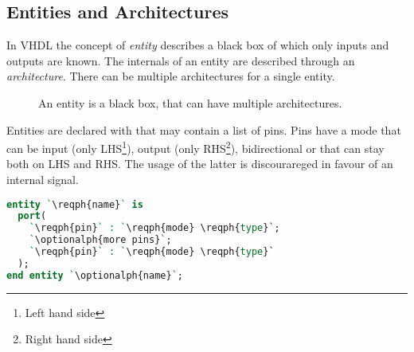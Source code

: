 \subsection{Entities and Architectures}
In VHDL the concept of \emph{entity} describes a black box of which only
inputs and outputs are known. The internals of an entity are described through
an \emph{architecture}. There can be multiple architectures for a single entity.

\begin{figure}[h]
  \centering
  \caption{An entity is a black box, that can have multiple architectures.}
\end{figure}

Entities are declared with  that may contain a list of pins. Pins
have a mode that can be  input (only LHS\footnote{Left hand side}),
 output (only RHS\footnote{Right hand side}), 
bidirectional or  that can stay both on LHS and RHS. The usage of
the latter is discourareged in favour of an internal signal.
\begin{lstlisting}[language=vhdl]
entity `\reqph{name}` is
  port(
    `\reqph{pin}` : `\reqph{mode} \reqph{type}`;
    `\optionalph{more pins}`;
    `\reqph{pin}` : `\reqph{mode} \reqph{type}`
  );
end entity `\optionalph{name}`;
\end{lstlisting}

